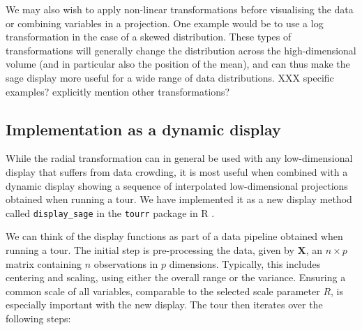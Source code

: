 \documentclass[]{interact}
\theoremstyle{plain}%
\theoremstyle{definition}
\theoremstyle{remark}
\begin{document}
We may also wish to apply non-linear transformations before visualising
the data or combining variables in a projection. One example would be to
use a log transformation in the case of a skewed distribution. These
types of transformations will generally change the distribution across
the high-dimensional volume (and in particular also the position of the
mean), and can thus make the sage display more useful for a wide range
of data distributions. XXX specific examples? explicitly mention other
transformations?

\hypertarget{sec:implementation}{%
\subsection{Implementation as a dynamic
display}\label{sec:implementation}}

While the radial transformation can in general be used with any
low-dimensional display that suffers from data crowding, it is most
useful when combined with a dynamic display showing a sequence of
interpolated low-dimensional projections obtained when running a tour.
We have implemented it as a new display method called
\texttt{display\_sage} in the \texttt{tourr} package \citep{tourr} in R
\citep{rref}.

We can think of the display functions as part of a data pipeline
obtained when running a tour. The initial step is pre-processing the
data, given by \(\mathbf{X}\), an \(n \times p\) matrix containing \(n\)
observations in \(p\) dimensions. Typically, this includes centering and
scaling, using either the overall range or the variance. Ensuring a
common scale of all variables, comparable to the selected scale
parameter \(R\), is especially important with the new display. The tour
then iterates over the following steps:
\end{document}

